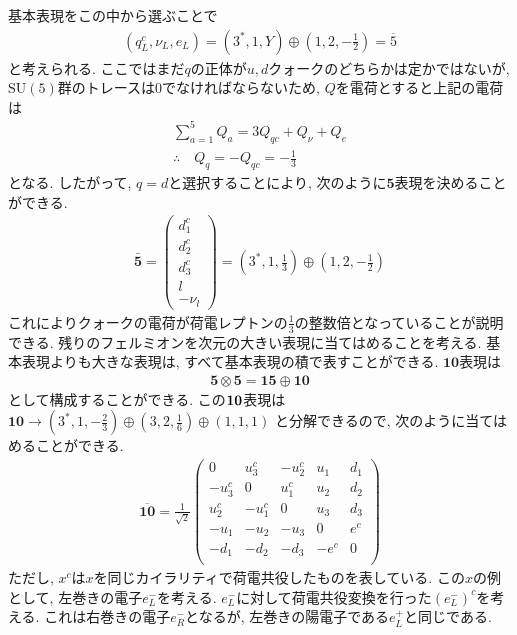 基本表現をこの中から選ぶことで
\begin{align}
  (q_L^c, \nu_L, e_L) = (3^*, 1, Y)\oplus\left(1,2,-\frac{1}{2}\right) = \overline{5}
\end{align}
と考えられる.
ここではまだ$q$の正体が$u, d$クォークのどちらかは定かではないが, $\mathrm{SU}(5)$群のトレースは0でなければならないため, $Q$を電荷とすると上記の電荷は
\begin{align}
  \sum_{a=1}^5 Q_a = 3Q_{qc}+Q_\nu + Q_e\nonumber\\
  \therefore\quad Q_q = -Q_{qc} = -\frac{1}{3}
\end{align}
となる.
したがって, $q=d$と選択することにより, 次のように$\bm{5}$表現を決めることができる.
\begin{align}
 \bar{\bm{5}}=\begin{pmatrix}
    d_1 ^c \\
    d_2 ^c \\
    d_3 ^c \\
    l      \\
    -\nu_l
  \end{pmatrix}=\left({3}^*,1,\frac{1}{3}\right)\oplus \left(1,2,-\frac{1}{2}\right)\label{GUT-5rep}
\end{align}
これによりクォークの電荷が荷電レプトンの$\frac{1}{3}$の整数倍となっていることが説明できる.
残りのフェルミオンを次元の大きい表現に当てはめることを考える.
基本表現よりも大きな表現は, すべて基本表現の積で表すことができる.
${\bm{10}}$表現は
\begin{align}
  \bm{5}\otimes\bm{5} = \bm{15}\oplus\bm{10}\nonumber
\end{align}
として構成することができる.
この$\bf{10}$表現は$\bm{10}\rightarrow (3^*,1,-\frac{2}{3})\oplus(3,2,\frac{1}{6})\oplus(1,1,1)$
と分解できるので, 次のように当てはめることができる.
\begin{align}
  \overline{\bm{10}}= \frac{1}{\sqrt{2}}\begin{pmatrix}
         0 &  u_3^c & -u_2^c & u_1 & d_1 \\
    -u_3^c &      0 &  u_1^c & u_2 & d_2 \\
     u_2^c & -u_1^c &      0 & u_3 & d_3 \\
    -u_1   &   -u_2 &   -u_3 &   0 & e^c \\
      -d_1 &   -d_2 &   -d_3 &-e^c &   0 \\
    \end{pmatrix}\label{GUT-10rep}
\end{align}
ただし, $x^c$は$x$を同じカイラリティで荷電共役したものを表している.
この$x$の例として, 左巻きの電子$e^-_L$を考える.
$e^-_L$に対して荷電共役変換を行った$(e^-_L)^c$を考える.
これは右巻きの電子$e_R^-$となるが, 左巻きの陽電子である$e_L^+$と同じである.

